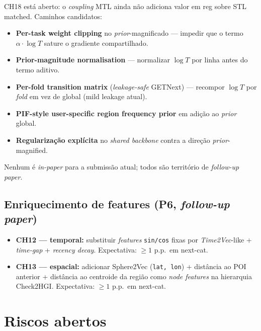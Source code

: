 \documentclass[11pt,a4paper]{article}
\begin{document}
CH18 está aberto: o \textit{coupling} MTL ainda não adiciona valor em reg sobre STL matched. Caminhos candidatos:

\begin{itemize}[leftmargin=*,noitemsep]
\item \textbf{Per-task weight clipping} no \textit{prior}-magnificado --- impedir que o termo $\alpha \cdot \log T$ sature o gradiente compartilhado.
\item \textbf{Prior-magnitude normalisation} --- normalizar $\log T$ por linha antes do termo aditivo.
\item \textbf{Per-fold transition matrix} (\textit{leakage-safe} GETNext) --- recompor $\log T$ por \textit{fold} em vez de global (mild leakage atual).
\item \textbf{PIF-style user-specific region frequency prior} em adição ao \textit{prior} global.
\item \textbf{Regularização explícita} no \textit{shared backbone} contra a direção \textit{prior}-magnified.
\end{itemize}

Nenhum é \textit{in-paper} para a submissão atual; todos são território de \textit{follow-up paper}.

\subsection*{Enriquecimento de features (P6, \textit{follow-up paper})}

\begin{itemize}[leftmargin=*,noitemsep]
\item \textbf{CH12 --- temporal:} substituir \textit{features} \texttt{sin/cos} fixas por \textit{Time2Vec}-like + \textit{time-gap} + \textit{recency decay}. Expectativa: $\ge 1$ p.p.\ em next-cat.
\item \textbf{CH13 --- espacial:} adicionar Sphere2Vec (\texttt{lat, lon}) + distância ao POI anterior + distância ao centroide da região como \textit{node features} na hierarquia Check2HGI. Expectativa: $\ge 1$ p.p.\ em next-cat.
\end{itemize}

\section{Riscos abertos}
\end{document}
